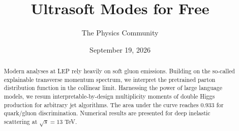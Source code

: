 \documentclass[11pt]{article}
\title{Ultrasoft Modes for Free}
\author{The Physics Community}
\date{September 19, 2026}
\begin{document}
\maketitle
\begin{abstract}
Modern analyses at LEP rely heavily on soft gluon emissions. Building on
the so-called explainable transverse momentum spectrum, we interpret the
pretrained parton distribution function in the collinear limit.
Harnessing the power of large language models, we resum
interpretable-by-design multiplicity moments of double Higgs production
for arbitrary jet algorithms. The area under the curve reaches 0.933 for
quark/gluon discrimination. Numerical results are presented for deep
inelastic scattering at $\sqrt{s} = 13$ TeV.
\end{abstract}
\tableofcontents




\nocite{*}


\end{document}
